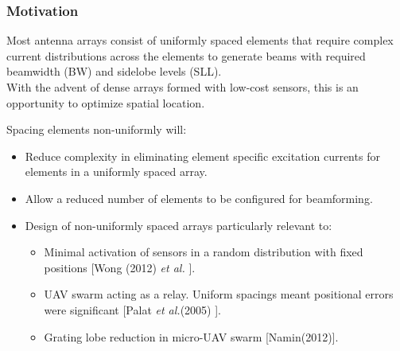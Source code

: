 \documentclass[...]{beamer}
\begin{document}
\begin{frame}
  \frametitle{Motivation}

  Most antenna arrays consist of uniformly spaced elements that require complex current distributions across the elements to generate beams with required beamwidth (BW) and sidelobe levels (SLL).\\
  \vspace{2mm}
  With the advent of dense arrays formed with low-cost sensors, this is an opportunity to optimize spatial location.\\
  \vspace{2mm}

  Spacing elements non-uniformly will:

  \begin{itemize}
    \item Reduce complexity in eliminating element specific excitation currents for elements in a uniformly spaced array.
    \item Allow a reduced number of elements to be configured for beamforming.
    \item Design of non-uniformly spaced arrays particularly relevant to:
      \vspace{-4mm}
      \begin{itemize}
        \item Minimal activation of sensors in a random distribution with fixed positions [Wong (2012) \textit{et al.} \cite{Wong2012}].
        \item UAV swarm acting as a relay.  Uniform spacings meant positional errors were significant [Palat \textit{et al.}(2005) \cite{Palat2005}].
        \item Grating lobe reduction in micro-UAV swarm [Namin(2012)\cite{Namin2012}].
      \end{itemize}
  \end{itemize}

\end{frame}
\end{document}
